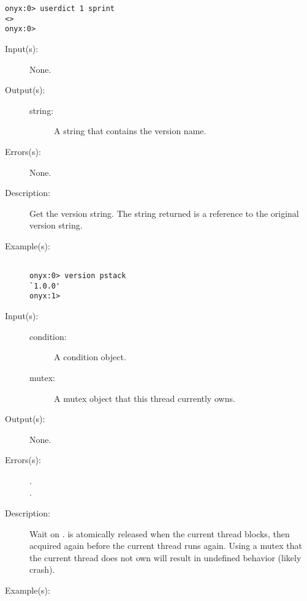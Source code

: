 \begin{description}
\begin{description}
\begin{verbatim}
onyx:0> userdict 1 sprint
<>
onyx:0>
		\end{verbatim}
	\end{description}
\label{systemdict:version}
\item[{\onyxop{--}{version}{string}}: ]
	\begin{description}\item[]
	\item[Input(s): ] None.
	\item[Output(s): ]
		\begin{description}\item[]
		\item[string: ]
			A string that contains the version name.
		\end{description}
	\item[Errors(s): ] None.
	\item[Description: ]
		Get the version string.  The string returned is a reference to
		the original version string.
	\item[Example(s): ]\begin{verbatim}

onyx:0> version pstack
`1.0.0'
onyx:1>
		\end{verbatim}
	\end{description}
\label{systemdict:wait}
\item[{\onyxop{condition mutex}{wait}{--}}: ]
	\begin{description}\item[]
	\item[Input(s): ]
		\begin{description}\item[]
		\item[condition: ]
			A condition object.
		\item[mutex: ]
			A mutex object that this thread currently owns.
		\end{description}
	\item[Output(s): ] None.
	\item[Errors(s): ]
		\begin{description}\item[]
		\item[.]
		\item[.]
		\end{description}
	\item[Description: ]
		Wait on .   is atomically released
		when the current thread blocks, then acquired again before the
		current thread runs again.  Using a mutex that the current
		thread does not own will result in undefined behavior (likely
		crash).
	\item[Example(s): ]\begin{verbatim}


\end{verbatim}
\end{description}
\end{description}
